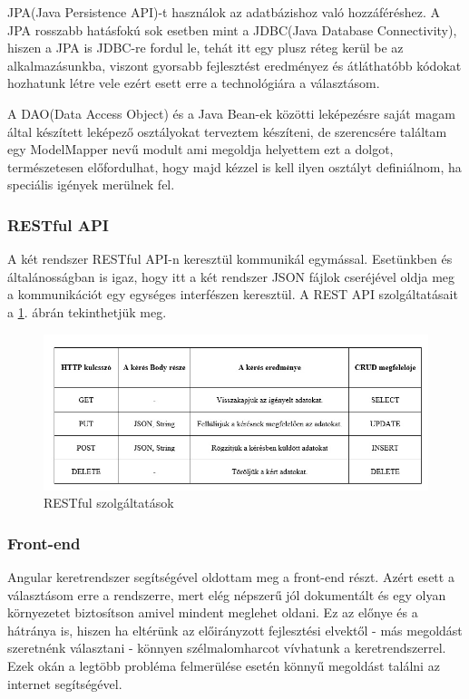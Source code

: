 JPA(Java Persistence API)-t használok az adatbázishoz való hozzáféréshez. A JPA rosszabb hatásfokú sok esetben mint a JDBC(Java Database Connectivity), hiszen a JPA is JDBC-re fordul le, tehát itt egy plusz réteg kerül be az alkalmazásunkba, viszont gyorsabb fejlesztést eredményez és átláthatóbb kódokat hozhatunk létre vele ezért esett erre a technológiára a választásom.

A DAO(Data Access Object) és a Java Bean-ek közötti leképezésre saját magam által készített leképező osztályokat terveztem készíteni, de szerencsére találtam egy ModelMapper nevű modult ami megoldja helyettem ezt a dolgot, természetesen előfordulhat, hogy majd kézzel is kell ilyen osztályt definiálnom, ha speciális igények merülnek fel.

\subsubsection{RESTful API}

A két rendszer RESTful API-n keresztül kommunikál egymással. Esetünkben és általánosságban is igaz, hogy itt a két rendszer JSON fájlok cseréjével oldja meg a kommunikációt egy egységes interfészen keresztül.
A REST API szolgáltatásait a \ref{fig:rest}. ábrán tekinthetjük meg.
\begin{figure}
\centering
\includegraphics[scale=0.75]{kepek/rest.jpg}
\caption{RESTful szolgáltatások}
\label{fig:rest}
\end{figure}

\subsubsection{Front-end}

Angular keretrendszer segítségével oldottam meg a front-end részt. Azért esett a választásom erre a rendszerre, mert elég népszerű jól dokumentált és egy olyan környezetet biztosítson amivel mindent meglehet oldani. Ez az előnye és a hátránya is, hiszen ha eltérünk az előirányzott fejlesztési elvektől - más megoldást szeretnénk választani - könnyen szélmalomharcot vívhatunk a keretrendszerrel. Ezek okán a legtöbb probléma felmerülése esetén könnyű megoldást találni az internet segítségével.

